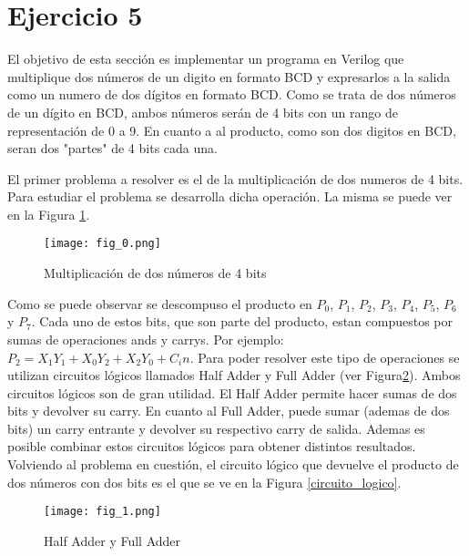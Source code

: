 \section{Ejercicio 5}


El objetivo de esta sección es implementar un programa en Verilog que multiplique dos números de un digito en formato BCD y expresarlos a la salida como un numero de dos dígitos en formato BCD. Como se trata
de dos números de un dígito en BCD, ambos números serán de 4 bits con un rango de representación de 0 a 9. En cuanto a al producto, como son dos digitos en BCD, seran dos "partes" de 4 bits cada una. 

El primer problema a resolver es el de la multiplicación de dos numeros de 4 bits. Para estudiar el problema se desarrolla dicha operación. La misma se puede ver en la Figura \ref{multiplicacion}. 


\begin{figure}[ht]                                                       
    \centering\texttt{[image: fig\_0.png]}
     \caption{Multiplicación de dos números de 4 bits}
     \label{multiplicacion}
     \end{figure}

Como se puede observar se descompuso el producto en $P_0$, $P_1$, $P_2$, $P_3$, $P_4$, $P_5$, $P_6$ y $P_7$. Cada uno de estos bits, que son parte del producto, estan compuestos por sumas de operaciones 
ands y carrys. Por ejemplo: $P_2 = X_1Y_1 + X_0Y_2 + X_2Y_0 + C_in$. Para poder resolver este tipo de operaciones se utilizan circuitos lógicos llamados Half Adder y Full Adder (ver Figura\ref{full_adder}). Ambos circuitos 
lógicos son de gran utilidad. El Half Adder permite hacer sumas de dos bits y devolver su carry. En cuanto al Full Adder, puede sumar (ademas de dos bits) un carry entrante y devolver su respectivo
carry de salida.  Ademas es posible combinar estos circuitos lógicos para obtener distintos resultados.
Volviendo al problema en cuestión, el circuito lógico que devuelve el producto de dos números con dos bits es el que se ve en la Figura \ref{circuito_logico}.


\begin{figure}[h!]                                                       
    \centering\texttt{[image: fig\_1.png]}
     \caption{Half Adder y Full Adder}
     \label{full_adder}
     \end{figure}



